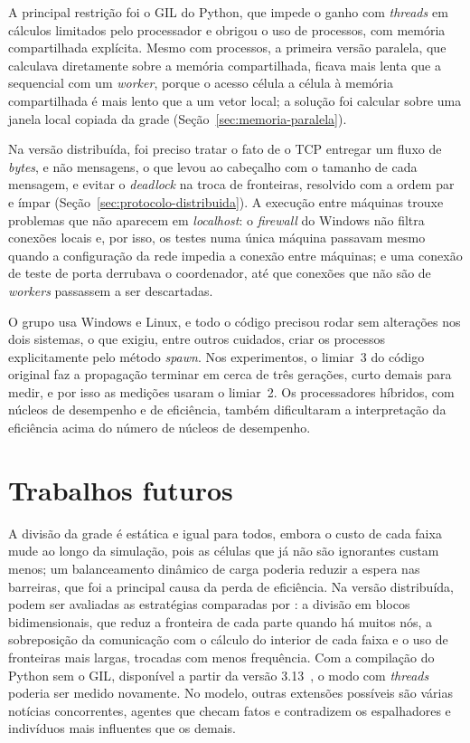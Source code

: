 A principal restrição foi o \ac{GIL} do Python, que impede o ganho com \textit{threads} em cálculos limitados pelo processador e obrigou o uso de processos, com memória compartilhada explícita. Mesmo com processos, a primeira versão paralela, que calculava diretamente sobre a memória compartilhada, ficava mais lenta que a sequencial com um \textit{worker}, porque o acesso célula a célula à memória compartilhada é mais lento que a um vetor local; a solução foi calcular sobre uma janela local copiada da grade (Seção~\ref{sec:memoria-paralela}).

Na versão distribuída, foi preciso tratar o fato de o \ac{TCP} entregar um fluxo de \textit{bytes}, e não mensagens, o que levou ao cabeçalho com o tamanho de cada mensagem, e evitar o \textit{deadlock} na troca de fronteiras, resolvido com a ordem par e ímpar (Seção~\ref{sec:protocolo-distribuida}). A execução entre máquinas trouxe problemas que não aparecem em \textit{localhost}: o \textit{firewall} do Windows não filtra conexões locais e, por isso, os testes numa única máquina passavam mesmo quando a configuração da rede impedia a conexão entre máquinas; e uma conexão de teste de porta derrubava o coordenador, até que conexões que não são de \textit{workers} passassem a ser descartadas.

O grupo usa Windows e Linux, e todo o código precisou rodar sem alterações nos dois sistemas, o que exigiu, entre outros cuidados, criar os processos explicitamente pelo método \textit{spawn}. Nos experimentos, o limiar~3 do código original faz a propagação terminar em cerca de três gerações, curto demais para medir, e por isso as medições usaram o limiar~2. Os processadores híbridos, com núcleos de desempenho e de eficiência, também dificultaram a interpretação da eficiência acima do número de núcleos de desempenho.

\section{Trabalhos futuros}

A divisão da grade é estática e igual para todos, embora o custo de cada faixa mude ao longo da simulação, pois as células que já não são ignorantes custam menos; um balanceamento dinâmico de carga poderia reduzir a espera nas barreiras, que foi a principal causa da perda de eficiência. Na versão distribuída, podem ser avaliadas as estratégias comparadas por : a divisão em blocos bidimensionais, que reduz a fronteira de cada parte quando há muitos nós, a sobreposição da comunicação com o cálculo do interior de cada faixa e o uso de fronteiras mais largas, trocadas com menos frequência. Com a compilação do Python sem o \ac{GIL}, disponível a partir da versão 3.13~\cite{Gross2023}, o modo com \textit{threads} poderia ser medido novamente. No modelo, outras extensões possíveis são várias notícias concorrentes, agentes que checam fatos e contradizem os espalhadores e indivíduos mais influentes que os demais.

